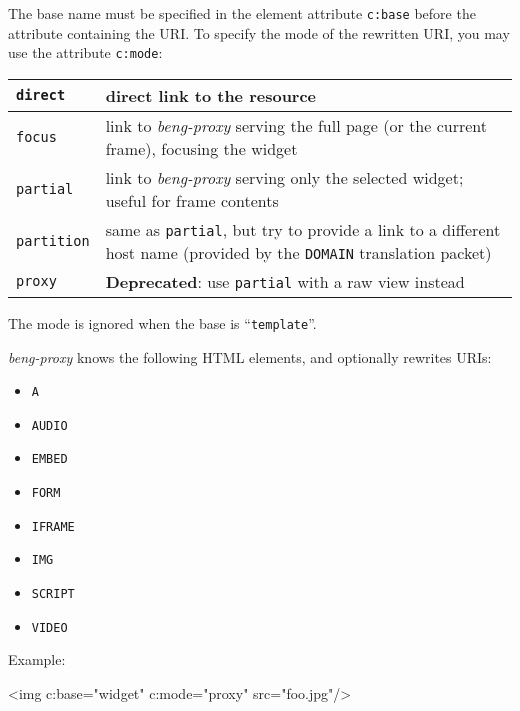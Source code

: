 \documentclass[a4paper,12pt]{article}
\begin{document}
The base name must be specified in the element attribute
\texttt{c:base} before the attribute containing the URI.  To specify
the mode of the rewritten URI, you may use the attribute
\texttt{c:mode}:

\begin{tabular}{|l|p{10cm}|}
\hline

\texttt{direct} & direct link to the resource \\

\hline

\texttt{focus} & link to \emph{beng-proxy} serving the full page (or
the current frame), focusing the widget \\

\hline

\texttt{partial} & link to \emph{beng-proxy} serving only the selected
widget; useful for frame contents \\

\hline

\texttt{partition} & same as \texttt{partial}, but try to provide a
link to a different host name (provided by the \texttt{DOMAIN}
translation packet) \\

\hline

\texttt{proxy} & \textbf{Deprecated}: use \texttt{partial} with a raw
view instead \\

\hline
\end{tabular}

The mode is ignored when the base is ``\texttt{template}''.

\emph{beng-proxy} knows the following HTML elements, and optionally
rewrites URIs:

\begin{itemize}
\item \texttt{A}
\item \texttt{AUDIO}
\item \texttt{EMBED}
\item \texttt{FORM}
\item \texttt{IFRAME}
\item \texttt{IMG}
\item \texttt{SCRIPT}
\item \texttt{VIDEO}
\end{itemize}

Example:

\begin{verbatim*}
<img c:base="widget" c:mode="proxy" src="foo.jpg"/>
\end{verbatim*}
\end{document}
